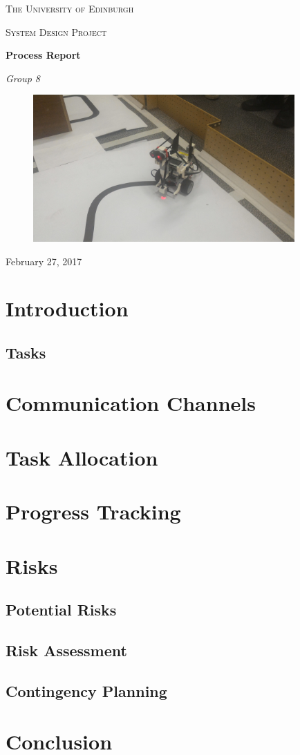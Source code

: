 \documentclass[a4paper,12pt]{article}
\begin{document}
\begin{titlepage}
	\centering
	{\scshape\LARGE The University of Edinburgh \par}
	\vspace{1cm}
	{\scshape\Large System Design Project\par}
	\vspace{1.5cm}
	{\huge\bfseries Process Report\par}
	\vspace{2cm}
	{\Large\itshape Group 8\par}
	\vfill
\begin{figure}[H]
    \centering
    \includegraphics[width=10cm]{robot}
    \label{fig:robot}
\end{figure}
	\vfill

	{\large February 27, 2017\par}
\end{titlepage}

\section{Introduction}
\subsection{Tasks}

\section{Communication Channels}

\section{Task Allocation}

\section{Progress Tracking}

\section{Risks}
\subsection{Potential Risks}
\subsection{Risk Assessment}
\subsection{Contingency Planning}
\section{Conclusion}
\end{document}
